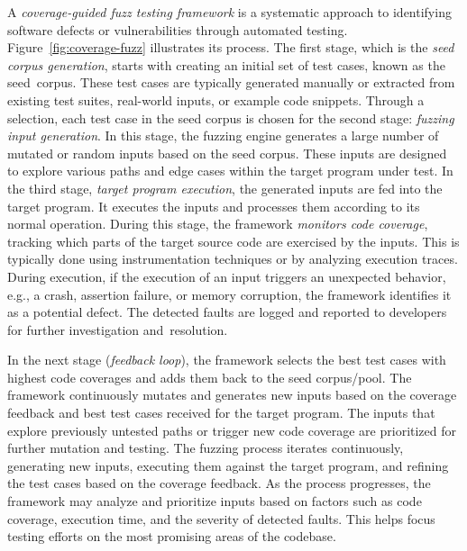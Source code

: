 A {\em coverage-guided fuzz testing framework} is a systematic approach to
identifying software defects or vulnerabilities through automated
testing. Figure~\ref{fig:coverage-fuzz} illustrates its process. The
first stage, which is the {\em seed corpus generation}, starts with
creating an initial set of test cases, known as the seed~corpus. These
test cases are typically generated manually or extracted from existing
test suites, real-world inputs, or example code snippets. Through a
selection, each test case in the seed corpus is chosen for the second
stage: {\em fuzzing input generation}. In this stage, the fuzzing
engine generates a large number of mutated or random inputs based on
the seed corpus. These inputs are designed to explore various paths
and edge cases within the target program under test. In the third
stage, {\em target program execution}, the generated inputs are fed
into the target program. It executes the inputs and
processes them according to its normal operation. During this stage,
the framework {\em monitors code coverage}, tracking which parts of
the target source code are exercised by the inputs. This is typically
done using instrumentation techniques or by analyzing execution
traces. During execution, if the execution of an input triggers an
unexpected behavior, e.g., a crash, assertion failure, or memory
corruption, the framework identifies it as a potential defect. The
detected faults are logged and reported to developers for further
investigation and~resolution.

In the next stage ({\em feedback loop}), the framework selects the
best test cases with highest code coverages and adds them back to the
seed corpus/pool. The framework continuously mutates and generates new
inputs based on the coverage feedback and best test cases received
for the target program. The inputs that explore previously untested
paths or trigger new code coverage are prioritized for further
mutation and testing. The fuzzing process iterates continuously,
generating new inputs, executing them against the target program, and
refining the test cases based on the coverage feedback. As the process
progresses, the framework may analyze and prioritize inputs based on
factors such as code coverage, execution time, and the severity of
detected faults. This helps focus testing efforts on the most
promising areas of the codebase.

